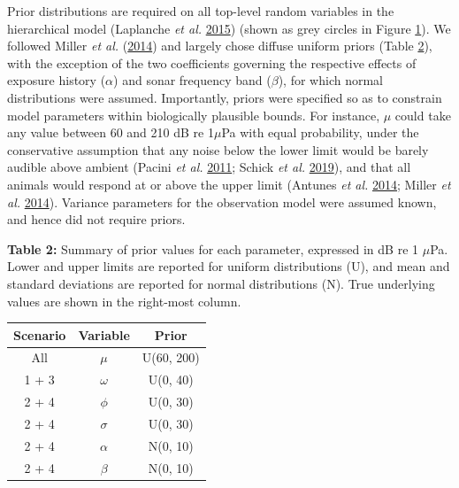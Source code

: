 \documentclass[
]{article}
\begin{document}
Prior distributions are required on all top-level random variables in the hierarchical model (Laplanche \emph{et al.} \protect\hyperlink{ref-Laplanche2015}{2015}) (shown as grey circles in Figure \hyperlink{fig1}{1}). We followed Miller \emph{et al.} (\protect\hyperlink{ref-Miller2014}{2014}) and largely chose diffuse uniform priors (Table \hyperlink{tab2}{2}), with the exception of the two coefficients governing the respective effects of exposure history (\(\alpha\)) and sonar frequency band (\(\beta\)), for which normal distributions were assumed. Importantly, priors were specified so as to constrain model parameters within biologically plausible bounds. For instance, \(\mu\) could take any value between 60 and 210 dB re 1\(\mu\)Pa with equal probability, under the conservative assumption that any noise below the lower limit would be barely audible above ambient (Pacini \emph{et al.} \protect\hyperlink{ref-Pacini2011}{2011}; Schick \emph{et al.} \protect\hyperlink{ref-Schick2019}{2019}), and that all animals would respond at or above the upper limit (Antunes \emph{et al.} \protect\hyperlink{ref-Antunes2014}{2014}; Miller \emph{et al.} \protect\hyperlink{ref-Miller2014}{2014}). Variance parameters for the observation model were assumed known, and hence did not require priors.

\textbf{Table 2:} \hypertarget{tab2}{}Summary of prior values for each parameter, expressed in dB re 1 \(\mu\)Pa. Lower and upper limits are reported for uniform distributions (U), and mean and standard deviations are reported for normal distributions (N). True underlying values are shown in the right-most column.

\renewcommand{\arraystretch}{1.1}
\begin{table}[H]
\centering
\begin{tabular}{ccc}
\toprule
\textbf{Scenario} & \textbf{Variable} & \textbf{Prior}\\
\midrule
\rowcolor{gray!6}  All & $\mu$ & U(60, 200)\\
1 + 3 & $\omega$ & U(0, 40)\\
\rowcolor{gray!6}  2 + 4 & $\phi$ & U(0, 30)\\
2 + 4 & $\sigma$ & U(0, 30)\\
\rowcolor{gray!6}  2 + 4 & $\alpha$ & N(0, 10)\\
2 + 4 & $\beta$ & N(0, 10)\\
\bottomrule
\end{tabular}
\end{table}
\end{document}
